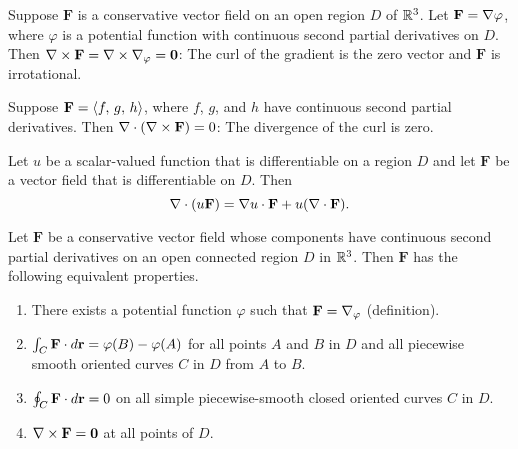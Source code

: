 \documentclass[mathNotesPreamble]{subfiles}
\begin{document}
  \begin{thmBox*}
    Suppose $\mathbf F$ is a conservative vector field on an open region $D$ of $\mathbb{R}^3$. Let $\mathbf F=\nabla \varphi$, where $\varphi$ is a potential function with continuous second partial derivatives on $D$. Then $\nabla\times\mathbf F=\nabla\times\nabla_\varphi=\mathbf{0}$: The curl of the gradient is the zero vector and $\mathbf F$ is irrotational.
  \end{thmBox*}

  \begin{thmBox*}
    Suppose $\mathbf F={\left\langle f,\,g,\,h \right\rangle}$, where $f$, $g$, and $h$ have continuous second partial derivatives. Then $\nabla\cdot{\left(\nabla\times\mathbf F\right)}=0$: The divergence of the curl is zero.
  \end{thmBox*}

  \begin{thmBox*}
    Let $u$ be a scalar-valued function that is differentiable on a region $D$ and let $\mathbf F$ be a vector field that is differentiable on $D$. Then
      \[\nabla\cdot{\left(u\mathbf F\right)}=\nabla u\cdot\mathbf F+u{\left(\nabla\cdot\mathbf F\right)}.\]
  \end{thmBox*}

  \begin{thmBox*}
    Let $\mathbf F$ be a conservative vector field whose components have continuous second partial derivatives on an open connected region $D$ in $\mathbb{R}^3$. Then $\mathbf F$ has the following equivalent properties.
    \begin{enumerate}
      \item 
        There exists a potential function $\varphi$ such that $\mathbf F=\nabla_\varphi$ (definition).
      \item 
        $\int_C \mathbf F\cdot d{\mathbf{r}}=\varphi(B)-\varphi(A)$ for all points $A$ and $B$ in $D$ and all piecewise smooth oriented curves $C$ in $D$ from $A$ to $B$.
      \item 
        $\oint_C \mathbf F\cdot d{\mathbf{r}}=0$ on all simple piecewise-smooth closed oriented curves $C$ in $D$.
      \item 
        $\nabla\times\mathbf F=\mathbf{0}$ at all points of $D$.
    \end{enumerate}
  \end{thmBox*}

  \pagebreak
  
\end{document}
